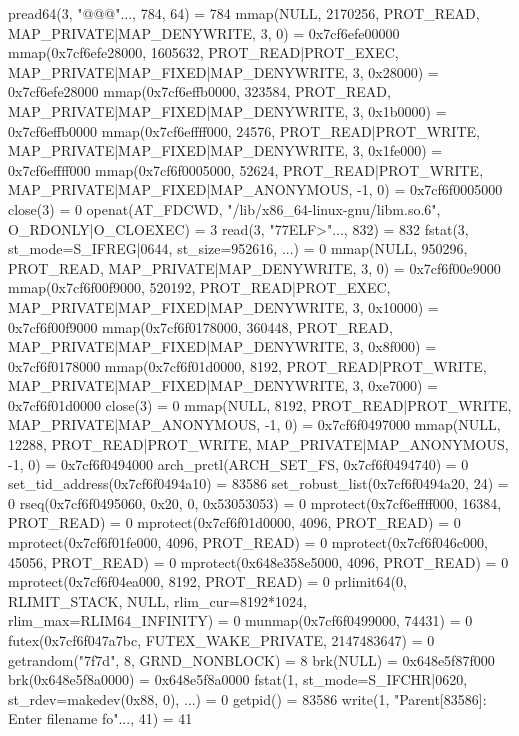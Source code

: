 \begin{breakableverbatim}
pread64(3, "\6\0\0\0\4\0\0\0@\0\0\0\0\0\0\0@\0\0\0\0\0\0\0@\0\0\0\0\0\0\0"..., 784, 64) = 784
mmap(NULL, 2170256, PROT\_READ, MAP\_PRIVATE|MAP\_DENYWRITE, 3, 0) = 0x7cf6efe00000
mmap(0x7cf6efe28000, 1605632, PROT\_READ|PROT\_EXEC, MAP\_PRIVATE|MAP\_FIXED|MAP\_DENYWRITE, 3, 0x28000) = 0x7cf6efe28000
mmap(0x7cf6effb0000, 323584, PROT\_READ, MAP\_PRIVATE|MAP\_FIXED|MAP\_DENYWRITE, 3, 0x1b0000) = 0x7cf6effb0000
mmap(0x7cf6effff000, 24576, PROT\_READ|PROT\_WRITE, MAP\_PRIVATE|MAP\_FIXED|MAP\_DENYWRITE, 3, 0x1fe000) = 0x7cf6effff000
mmap(0x7cf6f0005000, 52624, PROT\_READ|PROT\_WRITE, MAP\_PRIVATE|MAP\_FIXED|MAP\_ANONYMOUS, -1, 0) = 0x7cf6f0005000
close(3)                                = 0
openat(AT\_FDCWD, "/lib/x86\_64-linux-gnu/libm.so.6", O\_RDONLY|O\_CLOEXEC) = 3
read(3, "\177ELF\2\1\1\3\0\0\0\0\0\0\0\0\3\0>\0\1\0\0\0\0\0\0\0\0\0\0\0"..., 832) = 832
fstat(3, {st\_mode=S\_IFREG|0644, st\_size=952616, ...}) = 0
mmap(NULL, 950296, PROT\_READ, MAP\_PRIVATE|MAP\_DENYWRITE, 3, 0) = 0x7cf6f00e9000
mmap(0x7cf6f00f9000, 520192, PROT\_READ|PROT\_EXEC, MAP\_PRIVATE|MAP\_FIXED|MAP\_DENYWRITE, 3, 0x10000) = 0x7cf6f00f9000
mmap(0x7cf6f0178000, 360448, PROT\_READ, MAP\_PRIVATE|MAP\_FIXED|MAP\_DENYWRITE, 3, 0x8f000) = 0x7cf6f0178000
mmap(0x7cf6f01d0000, 8192, PROT\_READ|PROT\_WRITE, MAP\_PRIVATE|MAP\_FIXED|MAP\_DENYWRITE, 3, 0xe7000) = 0x7cf6f01d0000
close(3)                                = 0
mmap(NULL, 8192, PROT\_READ|PROT\_WRITE, MAP\_PRIVATE|MAP\_ANONYMOUS, -1, 0) = 0x7cf6f0497000
mmap(NULL, 12288, PROT\_READ|PROT\_WRITE, MAP\_PRIVATE|MAP\_ANONYMOUS, -1, 0) = 0x7cf6f0494000
arch\_prctl(ARCH\_SET\_FS, 0x7cf6f0494740) = 0
set\_tid\_address(0x7cf6f0494a10)         = 83586
set\_robust\_list(0x7cf6f0494a20, 24)     = 0
rseq(0x7cf6f0495060, 0x20, 0, 0x53053053) = 0
mprotect(0x7cf6effff000, 16384, PROT\_READ) = 0
mprotect(0x7cf6f01d0000, 4096, PROT\_READ) = 0
mprotect(0x7cf6f01fe000, 4096, PROT\_READ) = 0
mprotect(0x7cf6f046c000, 45056, PROT\_READ) = 0
mprotect(0x648e358e5000, 4096, PROT\_READ) = 0
mprotect(0x7cf6f04ea000, 8192, PROT\_READ) = 0
prlimit64(0, RLIMIT\_STACK, NULL, {rlim\_cur=8192*1024, rlim\_max=RLIM64\_INFINITY}) = 0
munmap(0x7cf6f0499000, 74431)           = 0
futex(0x7cf6f047a7bc, FUTEX\_WAKE\_PRIVATE, 2147483647) = 0
getrandom("\xaf{}\x7f\x7d\xcc{}", 8, GRND\_NONBLOCK) = 8
brk(NULL)                               = 0x648e5f87f000
brk(0x648e5f8a0000)                     = 0x648e5f8a0000
fstat(1, {st\_mode=S\_IFCHR|0620, st\_rdev=makedev(0x88, 0), ...}) = 0
getpid()                                = 83586
write(1, "Parent[83586]: Enter filename fo"..., 41) = 41

\end{breakableverbatim}
